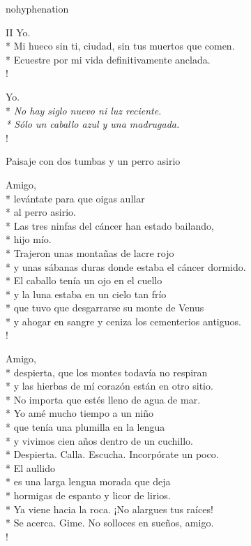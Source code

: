 \documentclass[
    a5paper,
    DIV=10,
    12pt,
    notitlepage,
    oneside,]
{scrbook} %
\begin{document}
\begin{hyphenrules}{nohyphenation}
\begin{poem}{II}{}{\vspace{-1em}}
Yo.\\*
Mi hueco sin ti, ciudad, sin tus muertos que comen.\\*
Ecuestre por mi vida definitivamente anclada.\\!

Yo.\\*
\emph{No hay siglo nuevo ni luz reciente.\\*
Sólo un caballo azul y una madrugada.} \\!

\end{poem}

\begin{poem}{Paisaje con dos tumbas y un perro asirio}{}{\vspace{-1em}}

Amigo,\\*
levántate para que oigas aullar\\*
al perro asirio.\\*
Las tres ninfas del cáncer han estado bailando,\\*
hijo mío.\\*
Trajeron unas montañas de lacre rojo\\*
y unas sábanas duras donde estaba el cáncer dormido.\\*
El caballo tenía un ojo en el cuello\\*
y la luna estaba en un cielo tan frío\\*
que tuvo que desgarrarse su monte de Venus\\*
y ahogar en sangre y ceniza los cementerios antiguos.\\!

Amigo,\\*
despierta, que los montes todavía no respiran\\*
y las hierbas de mí corazón están en otro sitio.\\*
No importa que estés lleno de agua de mar.\\*
Yo amé mucho tiempo a un niño\\*
que tenía una plumilla en la lengua\\*
y vivimos cien años dentro de un cuchillo.\\*
Despierta. Calla. Escucha. Incorpórate un poco.\\*
El aullido\\*
es una larga lengua morada que deja\\*
hormigas de espanto y licor de lirios.\\*
Ya viene hacia la roca. ¡No alargues tus raíces!\\*
Se acerca. Gime. No solloces en sueños, amigo.\\!


\end{poem}
\end{hyphenrules}
\end{document}
